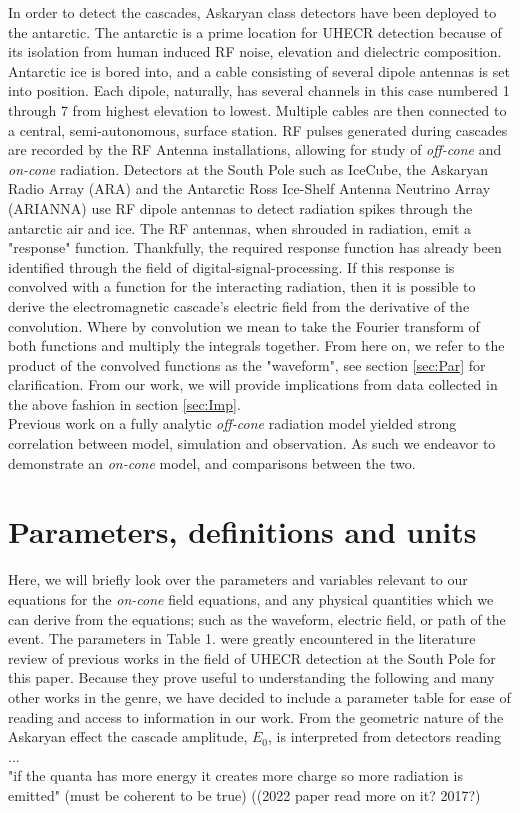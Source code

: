 \documentclass[amsmath,amssymb,aps,prd,10pt,twocolumn,showkeys]{revtex4}
\begin{document}
In order to detect the cascades, Askaryan class detectors have been deployed to the antarctic. The antarctic is a prime location for UHECR detection because of its isolation from human induced RF noise, elevation and dielectric composition. Antarctic ice is bored into, and a cable consisting of several dipole antennas is set into position. Each dipole, naturally, has several channels in this case numbered 1 through 7 from highest elevation to lowest. Multiple cables are then connected to a central, semi-autonomous, surface station. RF pulses generated during cascades are recorded by the RF Antenna installations, allowing for study of \textit{off-cone} and \textit{on-cone} radiation. Detectors at the South Pole such as IceCube, the Askaryan Radio Array (ARA) and the Antarctic Ross Ice-Shelf Antenna Neutrino Array (ARIANNA) use RF dipole antennas to detect radiation spikes through the antarctic air and ice. The RF antennas, when shrouded in radiation, emit a "response" function. Thankfully, the required response function has already been identified through the field of digital-signal-processing. If this response is convolved with a function for the interacting radiation, then it is possible to derive the electromagnetic cascade's electric field from the derivative of the convolution. Where by convolution we mean to take the Fourier transform of both functions and multiply the integrals together. From here on, we refer to the product of the convolved functions as the "waveform", see section \ref{sec:Par} for clarification. From our work, we will provide implications from data collected in the above fashion in section \ref{sec:Imp}.  \\
Previous work on a fully analytic \textit{off-cone} radiation model yielded strong correlation between model, simulation and observation. As such we endeavor to demonstrate an \textit{on-cone} model, and comparisons between the two. 

\section{Parameters, definitions and units}
Here, we will briefly look over the parameters and variables relevant to our equations for the \textit{on-cone} field equations, and any physical quantities which we can derive from the equations; such as the waveform, electric field, or path of the event.
The parameters in Table 1. were greatly encountered in the literature review of previous works in the field of UHECR detection at the South Pole for this paper. Because they prove useful to understanding the following and many other works in the genre, we have decided to include a parameter table for ease of reading and access to information in our work.
From the geometric nature of the Askaryan effect the cascade amplitude, $E_0$, is interpreted from detectors reading ...  \\
"if the quanta has more energy it creates more charge so more radiation is emitted" (must be coherent to be true) ((2022 paper read more on it? 2017?) \\ 
\end{document}
